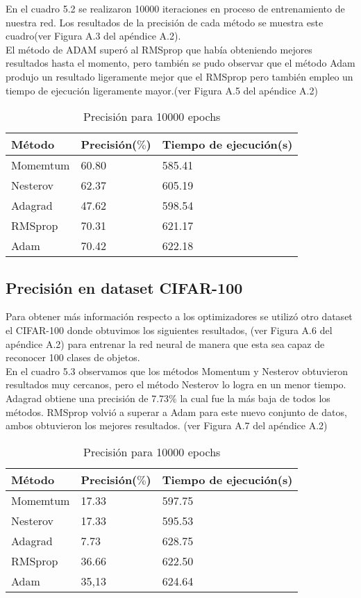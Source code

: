 En el cuadro 5.2 se realizaron 10000 iteraciones en proceso de entrenamiento de nuestra red. Los resultados de la precisión de cada método se muestra este cuadro(ver Figura A.3 del apéndice A.2).\\ El método de ADAM superó al RMSprop que había obteniendo mejores resultados hasta el momento, pero también se pudo observar que el método Adam produjo un resultado ligeramente mejor que el RMSprop pero también empleo un tiempo de ejecución ligeramente mayor.(ver Figura A.5 del apéndice A.2)
\begin{table}[H]
	\centering
	\caption{Precisión para 10000 epochs}
	\label{my-label}
	\begin{centering}
		\begin{tabular}{@{}lll@{}}
			\toprule
			Método& Precisión($\%$)&  Tiempo de ejecución(s)  \\ \midrule
			Momemtum& 60.80  & 585.41\\
			Nesterov& 62.37 &  605.19\\
			Adagrad&47.62  &  598.54 \\
			RMSprop& 70.31 &  621.17\\
			Adam& 70.42 & 622.18 \\ \bottomrule
		\end{tabular}
	\end{centering}
	
\end{table}

\subsection{Precisión en dataset CIFAR-100}
Para obtener más información respecto a los optimizadores se utilizó otro dataset el CIFAR-100 donde obtuvimos los siguientes resultados, (ver Figura A.6 del apéndice A.2) para entrenar la red neural de manera que esta sea capaz de reconocer 100 clases de objetos.\\ En el cuadro 5.3 observamos que los métodos Momentum y Nesterov obtuvieron resultados muy cercanos, pero el método Nesterov lo logra en un menor tiempo. Adagrad obtiene una precisión de 7.73$\%$ la cual fue la más baja de todos los métodos. RMSprop volvió a superar a Adam para este nuevo conjunto de datos, ambos obtuvieron los mejores resultados. (ver Figura A.7 del apéndice A.2) 
\begin{table}[H]
	\centering
	\caption{Precisión para 10000 epochs}
	\label{my-label}
	\begin{centering}
		\begin{tabular}{@{}lll@{}}
			\toprule
			Método& Precisión($\%$)&  Tiempo de ejecución(s)  \\ \midrule
			Momemtum& 17.33  & 597.75\\
			Nesterov& 17.33 &  595.53\\
			Adagrad&7.73  &  628.75 \\
			RMSprop& 36.66 &  622.50\\
			Adam& 35,13 & 624.64 \\ \bottomrule
		\end{tabular}
	\end{centering}
	
\end{table}

